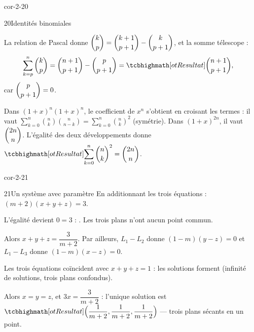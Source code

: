 \begin{blocLivre}{cor-2-20}
\begin{corrige}{20}{Identités binomiales}
\begin{questions}
  \item La relation de Pascal donne
    $\dbinom{k}{p}=\dbinom{k+1}{p+1}-\dbinom{k}{p+1}$, et la somme télescope :
    \[
      \sum_{k=p}^{n}\binom{k}{p}
      =\binom{n+1}{p+1}-\binom{p}{p+1}=\res{\binom{n+1}{p+1}},
    \]
    car $\dbinom{p}{p+1}=0$.
  \item Dans $(1+x)^{n}(1+x)^{n}$, le coefficient de $x^{n}$ s'obtient en
    croisant les termes : il vaut
    $\displaystyle\sum_{k=0}^{n}\binom{n}{k}\binom{n}{n-k}=\sum_{k=0}^{n}\binom{n}{k}^{2}$
    (symétrie). Dans $(1+x)^{2n}$, il vaut $\dbinom{2n}{n}$. L'égalité des
    deux développements donne
    $\res{\displaystyle\sum_{k=0}^{n}\binom{n}{k}^{2}=\binom{2n}{n}}$.
\end{questions}
\end{corrige}
\end{blocLivre}

\begin{blocLivre}{cor-2-21}
\begin{corrige}{21}{Un système avec paramètre}
En additionnant les trois équations : $(m+2)(x+y+z)=3$.

 L'égalité devient $0=3$ : .
Les trois plans n'ont aucun point commun.

 Alors $x+y+z=\dfrac{3}{m+2}$. Par ailleurs,
$L_1-L_2$ donne $(1-m)(y-z)=0$ et $L_1-L_3$ donne $(1-m)(x-z)=0$.

 Les trois équations coïncident avec $x+y+z=1$ : les
solutions forment  (infinité de solutions, trois
plans confondus).

 Alors $x=y=z$, et $3x=\dfrac{3}{m+2}$ :
l'unique solution est
$\res{\Bigl(\dfrac{1}{m+2},\dfrac{1}{m+2},\dfrac{1}{m+2}\Bigr)}$ — trois
plans sécants en un point.
\end{corrige}
\end{blocLivre}

